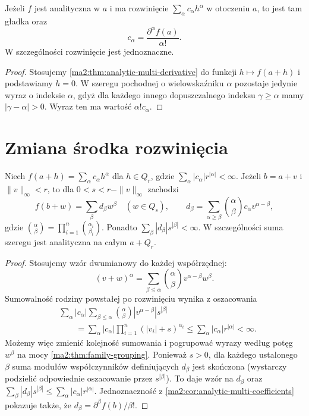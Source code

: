 \begin{wniosek}
\label{ma2:cor:analytic-multi-coefficients}
Jeżeli $f$ jest analityczna w $a$ i ma rozwinięcie
$\sum_\alpha c_\alpha h^\alpha$ w otoczeniu $a$,
to jest tam gładka oraz
\[
 c_\alpha=\frac{\partial^\alpha f(a)}{\alpha!}.
\]
W szczególności rozwinięcie jest jednoznaczne.
\end{wniosek}
\begin{proof}
Stosujemy \ref{ma2:thm:analytic-multi-derivative}
do funkcji $h\mapsto f(a+h)$ i podstawiamy $h=0$.
W szeregu pochodnej o wielowskaźniku $\alpha$
pozostaje jedynie wyraz o indeksie $\alpha$,
gdyż dla każdego innego dopuszczalnego indeksu
$\gamma\ge\alpha$ mamy $|\gamma-\alpha|>0$.
Wyraz ten ma wartość $\alpha!c_\alpha$.
\end{proof}

\section{Zmiana środka rozwinięcia}

\begin{twierdzenie}
\label{ma2:thm:analytic-recenter}
Niech $f(a+h)=\sum_\alpha c_\alpha h^\alpha$
dla $h\in Q_r$, gdzie
$\sum_\alpha |c_\alpha|r^{|\alpha|}<\infty$.
Jeżeli $b=a+v$ i $\|v\|_\infty<r$, to dla
$0<s<r-\|v\|_\infty$ zachodzi
\[
 f(b+w)=\sum_\beta d_\beta w^\beta
 \quad(w\in Q_s),\qquad
 d_\beta=\sum_{\alpha\ge\beta}
 \binom{\alpha}{\beta}c_\alpha v^{\alpha-\beta},
\]
gdzie $\binom{\alpha}{\beta}
=\prod_{i=1}^n\binom{\alpha_i}{\beta_i}$.
Ponadto $\sum_\beta |d_\beta|s^{|\beta|}<\infty$.
W szczególności suma szeregu jest analityczna
na całym $a+Q_r$.
\end{twierdzenie}
\begin{proof}
Stosujemy wzór dwumianowy do każdej współrzędnej:
\[
 (v+w)^\alpha
 =\sum_{\beta\le\alpha}\binom{\alpha}{\beta}
 v^{\alpha-\beta}w^\beta.
\]
Sumowalność rodziny powstałej po rozwinięciu
wynika z oszacowania
\[
 \begin{aligned}
 &\sum_\alpha |c_\alpha|
 \sum_{\beta\le\alpha}\binom{\alpha}{\beta}
 |v^{\alpha-\beta}|s^{|\beta|}\\
 &\qquad=\sum_\alpha |c_\alpha|
 \prod_{i=1}^n(|v_i|+s)^{\alpha_i}
 \le\sum_\alpha |c_\alpha|r^{|\alpha|}<\infty .
 \end{aligned}
\]
Możemy więc zmienić kolejność sumowania
i pogrupować wyrazy według potęg $w^\beta$
na mocy \ref{ma2:thm:family-grouping}.
Ponieważ $s>0$, dla każdego ustalonego $\beta$
suma modułów współczynników definiujących
$d_\beta$ jest skończona (wystarczy podzielić
odpowiednie oszacowanie przez $s^{|\beta|}$).
To daje wzór na $d_\beta$ oraz
$\sum_\beta|d_\beta|s^{|\beta|}
\le\sum_\alpha|c_\alpha|r^{|\alpha|}$.
Jednoznaczność z
\ref{ma2:cor:analytic-multi-coefficients}
pokazuje także, że
$d_\beta=\partial^\beta f(b)/\beta!$.
\end{proof}


